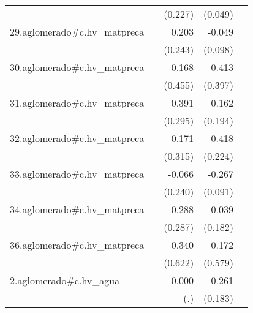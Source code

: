{\begin{longtable}{l*{4}{D{.}{.}{-1}}}
            &                     &     (0.227)         &     (0.049)         &                     \\
\addlinespace
29.aglomerado#c.hv\_matpreca&                     &       0.203         &      -0.049         &                     \\
            &                     &     (0.243)         &     (0.098)         &                     \\
\addlinespace
30.aglomerado#c.hv\_matpreca&                     &      -0.168         &      -0.413         &                     \\
            &                     &     (0.455)         &     (0.397)         &                     \\
\addlinespace
31.aglomerado#c.hv\_matpreca&                     &       0.391         &       0.162         &                     \\
            &                     &     (0.295)         &     (0.194)         &                     \\
\addlinespace
32.aglomerado#c.hv\_matpreca&                     &      -0.171         &      -0.418         &                     \\
            &                     &     (0.315)         &     (0.224)         &                     \\
\addlinespace
33.aglomerado#c.hv\_matpreca&                     &      -0.066         &      -0.267\sym{**} &                     \\
            &                     &     (0.240)         &     (0.091)         &                     \\
\addlinespace
34.aglomerado#c.hv\_matpreca&                     &       0.288         &       0.039         &                     \\
            &                     &     (0.287)         &     (0.182)         &                     \\
\addlinespace
36.aglomerado#c.hv\_matpreca&                     &       0.340         &       0.172         &                     \\
            &                     &     (0.622)         &     (0.579)         &                     \\
\addlinespace
2.aglomerado#c.hv\_agua&                     &       0.000         &      -0.261         &                     \\
            &                     &         (.)         &     (0.183)         &                     \\

\end{longtable}}
